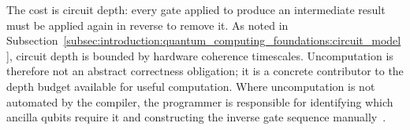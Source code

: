 The cost is circuit depth: every gate applied to produce an intermediate result must be applied again in reverse to remove it.
As noted in Subsection~\ref{subsec:introduction:quantum_computing_foundations:circuit_model}, circuit depth is bounded by hardware coherence timescales.
Uncomputation is therefore not an abstract correctness obligation; it is a concrete contributor to the depth budget available for useful computation.
Where uncomputation is not automated by the compiler, the programmer is responsible for identifying which ancilla qubits require it and constructing the inverse gate sequence manually~\cite{bichsel2020silq}.